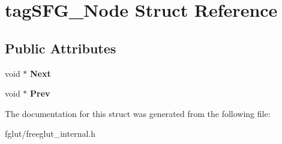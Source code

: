 \hypertarget{structtag_s_f_g___node}{}\section{tag\+S\+F\+G\+\_\+\+Node Struct Reference}
\label{structtag_s_f_g___node}
\subsection*{Public Attributes}
\begin{DoxyCompactItemize}
\item 
void $\ast$ {\bfseries Next}\hypertarget{structtag_s_f_g___node_ac8ccc632c2bc34290745a14d4199b3bd}{}\label{structtag_s_f_g___node_ac8ccc632c2bc34290745a14d4199b3bd}

\item 
void $\ast$ {\bfseries Prev}\hypertarget{structtag_s_f_g___node_a01c54cdb93da241f7f72608e91c95a82}{}\label{structtag_s_f_g___node_a01c54cdb93da241f7f72608e91c95a82}

\end{DoxyCompactItemize}


The documentation for this struct was generated from the following file\+:\begin{DoxyCompactItemize}
\item 
fglut/freeglut\+\_\+internal.\+h\end{DoxyCompactItemize}
